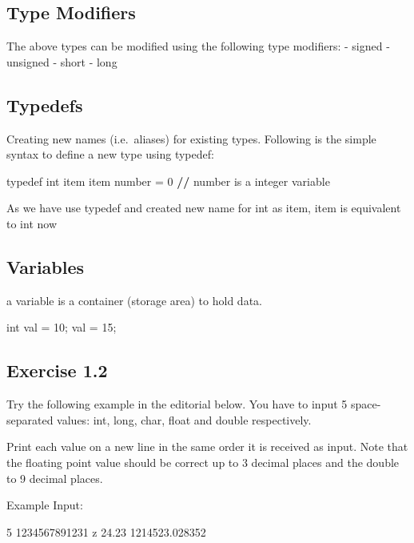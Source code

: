 \documentclass[
]{article}
\newenvironment{Shaded}{\begin{snugshade}}{\end{snugshade}}
\newcommand{\DecValTok}[1]{\textcolor[rgb]{0.00,0.00,0.81}{#1}}
\newcommand{\ErrorTok}[1]{\textcolor[rgb]{0.64,0.00,0.00}{\textbf{#1}}}
\newcommand{\NormalTok}[1]{#1}
\newcommand{\OtherTok}[1]{\textcolor[rgb]{0.56,0.35,0.01}{#1}}
\newcommand{\SpecialCharTok}[1]{\textcolor[rgb]{0.81,0.36,0.00}{\textbf{#1}}}
\begin{document}
\subsection{Type Modifiers}\label{type-modifiers}

The above types can be modified using the following type modifiers: -
signed - unsigned - short - long

\subsection{Typedefs}\label{typedefs}

Creating new names (i.e.~aliases) for existing types. Following is the
simple syntax to define a new type using typedef:

\begin{Shaded}
\begin{Highlighting}[]
\NormalTok{typedef int item}
\NormalTok{item number }\OtherTok{=} \DecValTok{0} \SpecialCharTok{/}\ErrorTok{/}\NormalTok{ number is a integer variable}
\end{Highlighting}
\end{Shaded}

As we have use typedef and created new name for int as item, item is
equivalent to int now

\subsection{Variables}\label{variables}

a variable is a container (storage area) to hold data.

int val = 10; val = 15;

\subsection{Exercise 1.2}\label{exercise-1.2}

Try the following example in the editorial below. You have to input 5
space-separated values: int, long, char, float and double respectively.

Print each value on a new line in the same order it is received as
input. Note that the floating point value should be correct up to 3
decimal places and the double to 9 decimal places.

Example Input:

5 1234567891231 z 24.23 1214523.028352
\end{document}
